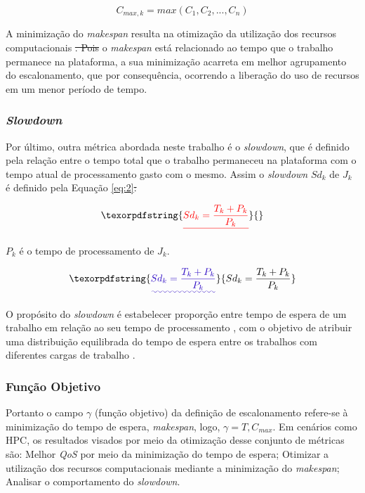 \documentclass[
	12pt,				%
	openright,			%
	oneside,			%
	a4paper,			%
	brazil				%
	]{abntex2}
\providecommand{\DIFaddtex}[1]{{\protect\color{blue}\uwave{#1}}} %
\providecommand{\DIFdeltex}[1]{{\protect\color{red}\sout{#1}}}                      %
\providecommand{\DIFaddbegin}{} %
\providecommand{\DIFaddend}{} %
\providecommand{\DIFdelbegin}{} %
\providecommand{\DIFdelend}{} %
\providecommand{\DIFadd}[1]{\texorpdfstring{\DIFaddtex{#1}}{#1}} %
\providecommand{\DIFdel}[1]{\texorpdfstring{\DIFdeltex{#1}}{}} %
\newcommand{\DIFscaledelfig}{0.5}
\newlength{\DIFdelgraphicswidth} %
\newlength{\DIFdelgraphicsheight} %
\newcommand{\DIFaddincludegraphics}[2][]{{\color{blue}\fbox{\DIFOincludegraphics[#1]{#2}}}} %
\newcommand{\DIFdelincludegraphics}[2][]{%
\sbox{\DIFdelgraphicsbox}{\DIFOincludegraphics[#1]{#2}}%
\settoboxwidth{\DIFdelgraphicswidth}{\DIFdelgraphicsbox} %
\settoboxtotalheight{\DIFdelgraphicsheight}{\DIFdelgraphicsbox} %
\scalebox{\DIFscaledelfig}{%
\parbox[b]{\DIFdelgraphicswidth}{\usebox{\DIFdelgraphicsbox}\\[-\baselineskip] \rule{\DIFdelgraphicswidth}{0em}}\llap{\resizebox{\DIFdelgraphicswidth}{\DIFdelgraphicsheight}{%
\setlength{\unitlength}{\DIFdelgraphicswidth}%
\begin{picture}(1,1)%
\thicklines\linethickness{2pt} %
{\color[rgb]{1,0,0}\put(0,0){\framebox(1,1){}}}%
{\color[rgb]{1,0,0}\put(0,0){\line( 1,1){1}}}%
{\color[rgb]{1,0,0}\put(0,1){\line(1,-1){1}}}%
\end{picture}%
}\hspace*{3pt}}} %
} %
\DeclareRobustCommand{\DIFaddbegin}{\DIFOaddbegin \let\includegraphics\DIFaddincludegraphics} %
\DeclareRobustCommand{\DIFaddend}{\DIFOaddend \let\includegraphics\DIFOincludegraphics} %
\DeclareRobustCommand{\DIFdelbegin}{\DIFOdelbegin \let\includegraphics\DIFdelincludegraphics} %
\DeclareRobustCommand{\DIFdelend}{\DIFOaddend \let\includegraphics\DIFOincludegraphics} %
\begin{document}
\begin{equation} \DIFaddbegin \label{eq:make}
\DIFaddend C_{max,k} = max(C_1, C_2, ..., C_n) 
\end{equation}

A minimização do \textit{makespan} resulta na otimização da utilização dos recursos computacionais \cite{pinedo2012scheduling}\DIFdelbegin \DIFdel{. Pois }\DIFdelend \DIFaddbegin \DIFadd{, pois }\DIFaddend o \textit{makespan} está relacionado ao tempo que o trabalho permanece na plataforma\DIFaddbegin \DIFadd{.
Ainda}\DIFaddend , a sua minimização acarreta em melhor agrupamento do escalonamento, que por consequência, ocorrendo a liberação do uso de recursos em um menor período de tempo.

\subsubsection{\textit{Slowdown}}
Por último, outra métrica abordada neste trabalho é o \textit{slowdown}, que é definido pela relação entre o tempo total que o trabalho permaneceu na plataforma com o tempo atual de processamento gasto com o mesmo. Assim o \textit{slowdown} $Sd_k$ de $J_k$  é definido pela Equação \ref{eq:2}\DIFdelbegin \DIFdel{:
}%

\begin{displaymath} \DIFdel{%
Sd_{k} = \frac{T_{k} + P_{k}}{P_{k}}
}\end{displaymath}%

\DIFdelend \DIFaddbegin \DIFadd{, sendo que }\DIFaddend \(P_{k}\) é o tempo de processamento de \(J_k\).
\DIFaddbegin 

\begin{equation} \DIFadd{\label{eq:2}
Sd_{k} = \frac{T_{k} + P_{k}}{P_{k}}
}\end{equation}

\DIFaddend O propósito do \textit{slowdown} é estabelecer  proporção entre tempo de espera de um trabalho em relação ao seu tempo de processamento \cite{Maccio2018}, com o objetivo de atribuir uma distribuição equilibrada do tempo de espera entre os trabalhos com diferentes cargas de trabalho \cite{CarastanSantos2019}.

\subsubsection{Função Objetivo}
Portanto o campo $\gamma$ (função objetivo) da definição de escalonamento refere-se à minimização do tempo de espera, \textit{makespan}, logo, $\gamma = T, C_{max}$. Em cenários como \ac{HPC}, os resultados visados por meio da otimização desse conjunto de métricas são: Melhor \textit{QoS} por meio da minimização do tempo de espera; Otimizar a utilização dos recursos computacionais mediante a minimização do \textit{makespan}; \DIFaddbegin \DIFadd{e }\DIFaddend Analisar o comportamento do \textit{slowdown}.
\end{document}
